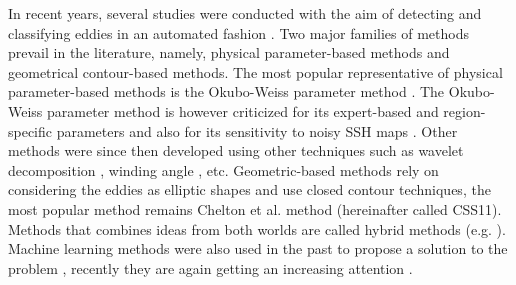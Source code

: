 \documentclass[journal]{IEEEtran}
\begin{document}
In recent years, several studies were conducted with the aim of detecting and classifying eddies in an automated fashion \cite{faghmous2012eddyscan}. Two major families of methods prevail in the literature, namely, physical parameter-based methods and geometrical contour-based methods. The most popular representative of physical parameter-based methods is the Okubo-Weiss parameter method \cite{okubo1970horizontal,weiss1991dynamics}. The Okubo-Weiss parameter method is however criticized for its expert-based and region-specific parameters and also for its sensitivity to noisy SSH maps \cite{chelton2007global}. Other methods were since then developed using other techniques such as wavelet decomposition \cite{turiel2007wavelet}, winding angle \cite{sadarjoen1999geometric}, etc. Geometric-based methods rely on considering the eddies as elliptic shapes and use closed contour techniques, the most popular method remains Chelton et al. method \cite{chelton2011global} (hereinafter called CSS11). Methods that combines ideas from both worlds are called hybrid methods (e.g. \cite{yi2014enhancing,isern2003identification}). Machine learning methods were also used in the past to propose a solution to the problem \cite{castellani2006identification,hai2008automatic}, recently they are again getting an increasing attention \cite{ashkezari2016oceanic,deepeddy}.  
% 
% 
% 
% 
\end{document}
